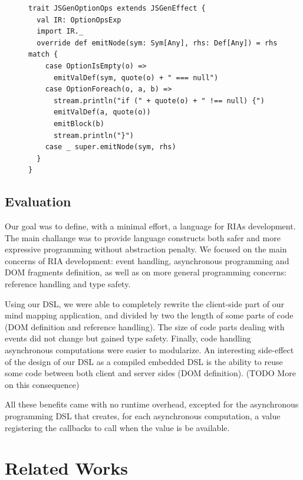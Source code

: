 \documentclass[american,english,runningheads]{llncs}
\begin{document}
\begin{figure}
\begin{lstlisting}[caption=Null reference handling DSL code generator,label=option-codegen]
trait JSGenOptionOps extends JSGenEffect {
  val IR: OptionOpsExp
  import IR._
  override def emitNode(sym: Sym[Any], rhs: Def[Any]) = rhs match {
    case OptionIsEmpty(o) =>
      emitValDef(sym, quote(o) + " === null")
    case OptionForeach(o, a, b) =>
      stream.println("if (" + quote(o) + " !== null) {")
      emitValDef(a, quote(o))
      emitBlock(b)
      stream.println("}")
    case _ super.emitNode(sym, rhs)
  }
}
\end{lstlisting}
\end{figure}


\subsection{Evaluation}

Our goal was to define, with a minimal effort, a language for RIAs development. The main challange was to provide
language constructs both safer and more expressive programming without abstraction penalty. We focused on the main
concerns of RIA development: event handling, asynchronous programming and DOM fragments definition, as well as on
more general programming concerns:  reference handling and type safety.

Using our DSL, we were able to completely rewrite the client-side part of our mind mapping application, and divided
by two the length of some parts of code (DOM definition and  reference handling). The size of code parts dealing with
events did not change but gained type safety. Finally, code handling asynchronous computations were easier to
modularize. An interesting side-effect of the design of our DSL as a compiled embedded DSL is the ability to reuse
some code between both client and server sides (DOM definition). (TODO More on this consequence)

All these benefits came with no runtime overhead, excepted for the asynchronous programming DSL that creates, for
each asynchronous computation, a  value registering the callbacks to call when the value is be
available.

\section{Related Works}
\label{related}
\end{document}
